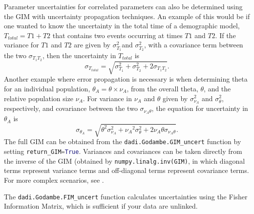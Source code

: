\documentclass[12pt]{article}
\makeatletter
\newcommand{\py}[1]{\lstinline[language=Python, showstringspaces=False]@#1@}
\makeatother
\begin{document}
Parameter uncertainties for correlated parameters can also be determined using the GIM with uncertainty propagation techniques.
An example of this would be if one wanted to know the uncertainty in the total time of a demographic model, ${T_{total}}=T1+T2$ that contains two events occurring at times ${T1}$ and ${T2}$.
If the variance for $T1$ and $T2$ are given by $\sigma_{T_1}^2$and $\sigma_{T_2}^2$, with a covariance term between the two $\sigma_{T_1T_2}$, then the uncertainty in ${T_{total}}$ is
\begin{equation}
\sigma_{T_{total}}=\sqrt{\sigma_{T_1}^2+\sigma_{T_2}^2+2\sigma_{T_1T_2}}.
\end{equation}
Another example where error propagation is necessary is when determining theta for an individual population, $\theta_{A}=\theta \times  \nu_{A}$, from the overall theta, $\theta$, and the relative population size $\nu_{A}$.
For variance in $\nu_{A}$ and $\theta$ given by $\sigma_{\nu_{A}}^2$ and $\sigma_{\theta}^2$, respectively, and covariance between the two $\sigma_{\nu_{A}\theta}$, the equation for uncertainty in $\theta_{A}$ is
\begin{equation}
\sigma_{{\theta_{A}}}=\sqrt{\theta^2\sigma_{\nu_{A}}^2+{\nu_{A}}^2\sigma_{\theta}^2+2 \nu_{A} \theta \sigma_{\nu_{A}\theta}}.
\end{equation}
The full GIM can be obtained from the \py{dadi.Godambe.GIM_uncert} function by setting \py{return_GIM=True}.
Variances and covariances can be taken directly from the inverse of the GIM (obtained by \py{numpy.linalg.inv(GIM)}, in which diagonal terms represent variance terms and off-diagonal terms represent covariance terms.
For more complex scenarios, see \cite{Ku1966}.

The \py{dadi.Godambe.FIM_uncert} function calculates uncertainties using the Fisher Information Matrix, which is sufficient if your data are unlinked.
\end{document}
